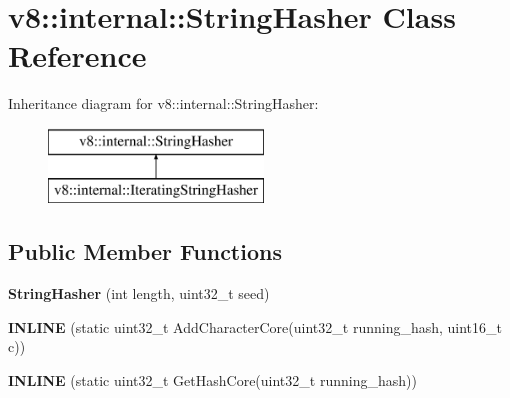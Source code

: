 \hypertarget{classv8_1_1internal_1_1_string_hasher}{}\section{v8\+:\+:internal\+:\+:String\+Hasher Class Reference}
\label{classv8_1_1internal_1_1_string_hasher}
Inheritance diagram for v8\+:\+:internal\+:\+:String\+Hasher\+:\begin{figure}[H]
\begin{center}
\leavevmode
\includegraphics[height=2.000000cm]{classv8_1_1internal_1_1_string_hasher}
\end{center}
\end{figure}
\subsection*{Public Member Functions}
\begin{DoxyCompactItemize}
\item 
\hypertarget{classv8_1_1internal_1_1_string_hasher_af4f8239d27611f3ae046e1e48053ea45}{}{\bfseries String\+Hasher} (int length, uint32\+\_\+t seed)\label{classv8_1_1internal_1_1_string_hasher_af4f8239d27611f3ae046e1e48053ea45}

\item 
\hypertarget{classv8_1_1internal_1_1_string_hasher_a23495a72164e10ee8d52fb6fa4d25a74}{}{\bfseries I\+N\+L\+I\+N\+E} (static uint32\+\_\+t Add\+Character\+Core(uint32\+\_\+t running\+\_\+hash, uint16\+\_\+t c))\label{classv8_1_1internal_1_1_string_hasher_a23495a72164e10ee8d52fb6fa4d25a74}

\item 
\hypertarget{classv8_1_1internal_1_1_string_hasher_af6fc8d62789d14fb989a180ad42783fe}{}{\bfseries I\+N\+L\+I\+N\+E} (static uint32\+\_\+t Get\+Hash\+Core(uint32\+\_\+t running\+\_\+hash))\label{classv8_1_1internal_1_1_string_hasher_af6fc8d62789d14fb989a180ad42783fe}

\end{DoxyCompactItemize}
